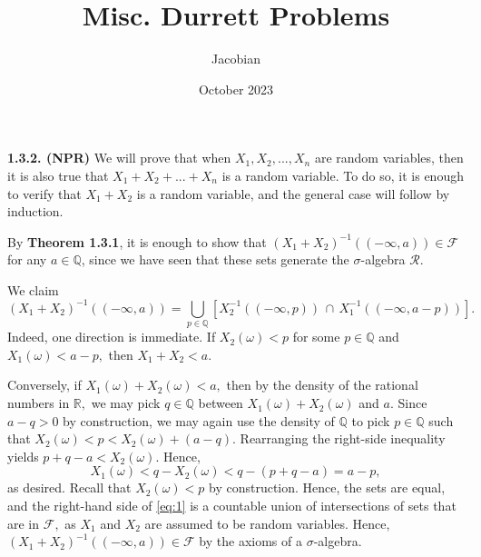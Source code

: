 \documentclass[12pt]{article}
\title{Misc. Durrett Problems}
\author{Jacobian}
\date{October 2023}
\begin{document}
\maketitle

\textbf{1.3.2. (NPR)} We will prove that when $X_1, X_2,..., X_n$ are random variables, then it is also true that $X_1+X_2+...+X_n$ is a random variable. To do so, it is enough to verify that $X_1+X_2$ is a random variable, and the general case will follow by induction.

By \textbf{Theorem 1.3.1}, it is enough to show that $(X_1+X_2)^{-1}((-\infty, a))\in \mathcal{F}$ for any $a\in \mathbb{Q}$, since we have seen that these sets generate the $\sigma$-algebra $\mathcal{R}.$

We claim 
\begin{equation}
    (X_1+X_2)^{-1}((-\infty,a)) = \bigcup_{p\in\mathbb{Q}} \left[X_2^{-1}((-\infty,p))\,\cap\,X_1^{-1}((-\infty,a-p))\right].\label{eq:1}
\end{equation}
\indent Indeed, one direction is immediate. If $X_2(\omega)<p$ for some $p\in\mathbb{Q}$ and $X_1(\omega)<a-p,$ then $X_1+X_2<a.$

Conversely, if $X_1(\omega)+X_2(\omega)<a,$ then by the density of the rational numbers in $\mathbb{R},$ we may pick $q\in\mathbb{Q}$ between $X_1(\omega)+X_2(\omega)$ and $a.$ Since $a-q>0$ by construction, we may again use the density of $\mathbb{Q}$ to pick $p\in\mathbb{Q}$ such that $X_2(\omega)<p<X_2(\omega) + (a-q).$ Rearranging the right-side inequality yields $p+q-a<X_2(\omega).$ Hence,
$$X_1(\omega) < q-X_2(\omega) < q-(p+q-a) = a-p,$$
as desired. Recall that $X_2(\omega)<p$ by construction. Hence, the sets are equal, and the right-hand side of \eqref{eq:1} is a countable union of intersections of sets that are in $\mathcal{F},$ as $X_1$ and $X_2$ are assumed to be random variables. Hence, $(X_1+X_2)^{-1}((-\infty,a))\in \mathcal{F}$ by the axioms of a $\sigma$-algebra.
\end{document}
